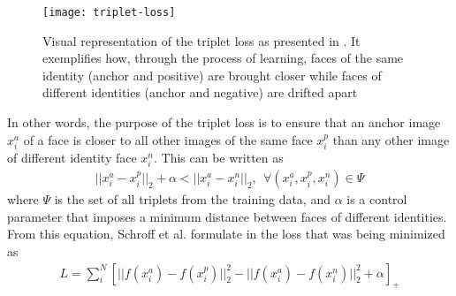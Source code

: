 \begin{figure}[h]
	\begin{center}
		\texttt{[image: triplet-loss]}
		\caption[Triplet loss visualisation]{Visual representation of the triplet loss as presented in \cite{SchroffKP15}. It exemplifies how, through the process of learning, faces of the same identity (anchor and positive) are brought closer while faces of different identities (anchor and negative) are drifted apart }
	\end{center}
\end{figure}

In other words, the purpose of the triplet loss is to ensure that an anchor image $x_{i}^{a}$ of a face is closer to all other images of the same face $x_{i}^{p}$ than any other image of different identity face $x_{i}^{n}$. This can be written as
\begin{align}
	||x_{i}^{a}  - x_{i}^{p} ||_{2} + \alpha < ||x_{i}^{a}  - x_{i}^{n} ||_{2}, \ \ \forall (x_{i}^{a}, x_{i}^{p}, x_{i}^{n}) \in \Psi
\end{align} where $\Psi$ is the set of all triplets from the training data, and $\alpha$ is a control parameter that imposes a minimum distance between faces of different identities. From this equation, Schroff et al. formulate in \cite{SchroffKP15} the loss that was being minimized as 
\begin{align}
L = \sum_{i}^{N} [||f(x_{i}^{a}) - f(x_{i}^{p})||_{2}^{2} - ||f(x_i^a) - f(x_i^n)||_{2}^{2} + \alpha]_{+}
\end{align}

